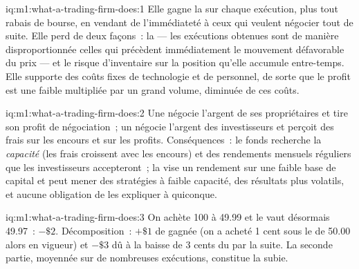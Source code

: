 \begin{solution}{iq:m1:what-a-trading-firm-does:1}
Elle gagne la  sur chaque exécution, plus tout rabais de bourse, en vendant
de l'immédiateté à ceux qui veulent négocier tout de suite. Elle perd de deux façons~: la 
--- les exécutions obtenues sont de manière disproportionnée celles qui précèdent immédiatement le
mouvement défavorable du prix --- et le risque d'inventaire sur la position qu'elle accumule
entre-temps. Elle supporte des coûts fixes de technologie et de personnel, de sorte que le profit est une
faible  multipliée par un grand volume, diminuée de ces coûts.
\end{solution}

\begin{solution}{iq:m1:what-a-trading-firm-does:2}
Une  négocie l'argent de ses propriétaires et tire son profit de négociation~; un
 négocie l'argent des investisseurs et perçoit des frais sur les encours et sur les profits.
Conséquences~: le fonds recherche la \emph{capacité} (les frais croissent avec les encours) et
des rendements mensuels réguliers que les investisseurs accepteront~; la  vise un rendement sur une faible base de capital et peut mener des stratégies à faible
capacité, des résultats plus volatils, et aucune obligation de les expliquer à quiconque.
\end{solution}

\begin{solution}{iq:m1:what-a-trading-firm-does:3}
On achète 100 à 49.99 et le  vaut désormais 49.97~: $-\$2$. Décomposition~: $+\$1$ de
 gagnée (on a acheté 1 cent sous le  de 50.00 alors en vigueur) et $-\$3$ dû à
la baisse de 3 cents du  par la suite. La seconde partie, moyennée sur de nombreuses
exécutions, constitue la  subie.
\end{solution}

